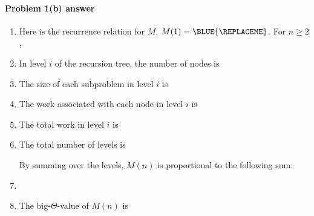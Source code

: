 
\paragraph{Problem 1(b) answer}

\begin{enumerate}[label=(\roman*)]
\item[] Here is the recurrence relation for $M$.
  \(M(1) = \BLUE{
    \REPLACEME
  }\).
  For $n\ge 2$, \BLUE{
    \[ M(n) =
      \REPLACEME
    \]
  }

\item[] In level $i$ of the recursion tree, the number of nodes is \BLUE{
    \[
      \REPLACEME
    \]
    }
  
\item[] 

  The size of each subproblem in level $i$ is \BLUE{
    \[
      \REPLACEME 
    \]
  }

\item[] 

  The work associated with each node in level $i$ is \BLUE{
    \[
      \REPLACEME 
    \]
  }

\item[] 

  The total work in level $i$ is \BLUE{
    \[
      \REPLACEME 
    \]
  }

\item[]

  The total number of levels is \BLUE{
    \[
      \REPLACEME 
    \]
  }
  
  By summing over the levels, $M(n)$ is proportional to the following sum:
  
\item[]
  \BLUE{
    \[
      \REPLACEME   %
    \]
  }

\vfill 

\item[]
  
  The big-$\Theta$-value of $M(n)$ is \BLUE{
    \[
      \REPLACEME
    \]
  }
\end{enumerate}


